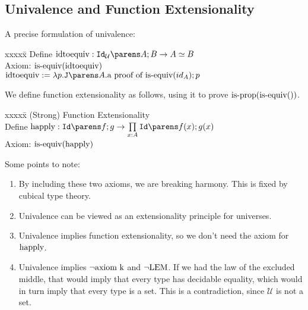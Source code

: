 \documentclass[11pt]{article}
\newcommand{\U}{\ensuremath{\mathcal{U}}}
\newcommand{\isequiv}[1]{\ensuremath{\textnormal{is-equiv}(#1)}}
\newcommand{\isprop}[1]{\ensuremath{\textnormal{is-prop}(#1)}}
\newcommand{\idtoequiv}{\textnormal{idtoequiv}}
\newcommand{\funapp}{\textnormal{happly}}
\begin{document}
\subsection{Univalence and Function Extensionality}
A precise formulation of univalence:
\begin{tabbing}
  xxxxx\= \kill
  \> Define $\oftype{\idtoequiv}{\idtype{\U}{A}{B} \rightarrow A \simeq B}$ \\
  \> Axiom:  $\isequiv{\idtoequiv}$ \\
  \> $\idtoequiv := \lambda p.\idJ{A}{\textnormal{a proof of \isequiv{id_A}}}{p}$
\end{tabbing}
We define function extensionality as follows, using it to prove $\isprop{\isequiv{}}$.
\begin{tabbing}
  xxxxx\= \kill
  \> (Strong) Function Extensionality \\
  \> Define $\oftype{\funapp}{\idtype{f}{g}} \rightarrow \dfuntype{x}{A}{\idtype{f(x)}{g(x)}}$ \\
  \> Axiom:  $\isequiv{\funapp}$
\end{tabbing}

Some points to note:
\begin{enumerate}
\item By including these two axioms, we are breaking harmony.  This is
  fixed by cubical type theory.
\item Univalence can be viewed as an extensionality principle for
  universes.
\item Univalence implies function extensionality, so we don't need the
  axiom for $\funapp$.
\item Univalence implies $\lnot\textnormal{axiom k}$ and
  $\lnot\textnormal{LEM}$.  If we had the law of the excluded
  middle, that would imply that every type has decidable equality,
  which would in turn imply that every type is a set.  This is a
  contradiction, since \U{} is not a set.
\end{enumerate}


\printbibliography
\end{document}
